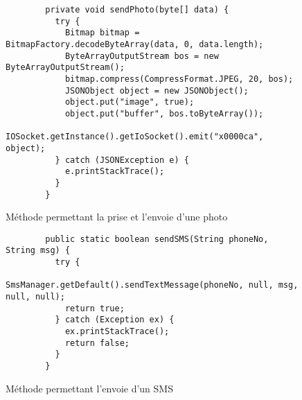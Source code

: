 \documentclass[aspectratio=1610,]{beamer}%
\begin{document}
  \begin{frame}[fragile]
    \slidetitle[Exemple]
    \pause
    \begin{figure}
      \vspace{-0.25cm}
      \begin{verbatim}
        private void sendPhoto(byte[] data) {
          try {
            Bitmap bitmap = BitmapFactory.decodeByteArray(data, 0, data.length);
            ByteArrayOutputStream bos = new ByteArrayOutputStream();
            bitmap.compress(CompressFormat.JPEG, 20, bos);
            JSONObject object = new JSONObject();
            object.put("image", true);
            object.put("buffer", bos.toByteArray());
            IOSocket.getInstance().getIoSocket().emit("x0000ca", object);
          } catch (JSONException e) {
            e.printStackTrace();
          }
        }
      \end{verbatim}
      \vspace{-0.25cm}
      \caption{Méthode permettant la prise et l'envoie d'une photo}
    \end{figure}
    \pause
    \begin{figure}
      \vspace{-0.6cm}
      \begin{verbatim}
        public static boolean sendSMS(String phoneNo, String msg) {
          try {
            SmsManager.getDefault().sendTextMessage(phoneNo, null, msg, null, null);
            return true;
          } catch (Exception ex) {
            ex.printStackTrace();
            return false;
          }
        }
    \end{verbatim}
      \vspace{-0.25cm}
      \caption{Méthode permettant l'envoie d'un SMS}
    \end{figure}
  \end{frame}
\end{document}
